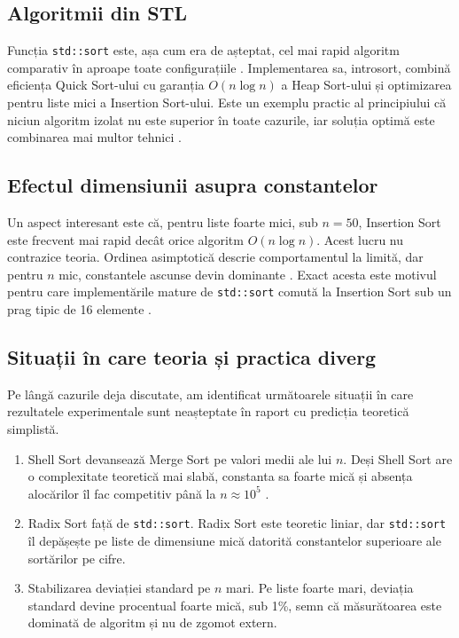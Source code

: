 \documentclass[12pt, a4paper]{article}
\begin{document}
\subsection{Algoritmii din STL}

Funcția \texttt{std::sort} este, așa cum era de așteptat, cel mai rapid
algoritm comparativ în aproape toate configurațiile \citep{musser1997,
cppreference_sort}. Implementarea sa, introsort, combină eficiența Quick
Sort-ului cu garanția $O(n \log n)$ a Heap Sort-ului și optimizarea pentru
liste mici a Insertion Sort-ului. Este un exemplu practic al principiului
că niciun algoritm izolat nu este superior în toate cazurile, iar soluția
optimă este combinarea mai multor tehnici \citep{mcilroy1993}.

\subsection{Efectul dimensiunii asupra constantelor}

Un aspect interesant este că, pentru liste foarte mici, sub $n = 50$,
Insertion Sort este frecvent mai rapid decât orice algoritm $O(n \log n)$.
Acest lucru nu contrazice teoria. Ordinea asimptotică descrie
comportamentul la limită, dar pentru $n$ mic, constantele ascunse devin
dominante \citep{sedgewick2011}. Exact acesta este motivul pentru care
implementările mature de \texttt{std::sort} comută la Insertion Sort sub un
prag tipic de 16 elemente \citep{musser1997}.

\subsection{Situații în care teoria și practica diverg}

Pe lângă cazurile deja discutate, am identificat următoarele situații în
care rezultatele experimentale sunt neașteptate în raport cu predicția
teoretică simplistă.

\begin{enumerate}
    \item Shell Sort devansează Merge Sort pe valori medii ale lui $n$.
    Deși Shell Sort are o complexitate teoretică mai slabă, constanta sa
    foarte mică și absența alocărilor îl fac competitiv până la
    $n \approx 10^5$ \citep{shell1959, knuth1998}.
    \item Radix Sort față de \texttt{std::sort}. Radix Sort este teoretic
    liniar, dar \texttt{std::sort} îl depășește pe liste de dimensiune
    mică datorită constantelor superioare ale sortărilor pe cifre.
    \item Stabilizarea deviației standard pe $n$ mari. Pe liste foarte
    mari, deviația standard devine procentual foarte mică, sub 1\%, semn
    că măsurătoarea este dominată de algoritm și nu de zgomot extern.
\end{enumerate}
\end{document}
